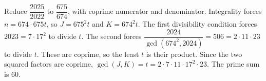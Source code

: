 Reduce $\dfrac{2025}{2022}$ to $\dfrac{675}{674}$, with coprime numerator and denominator. Integrality forces $n=674\cdot675t$, so $J=675^2t$ and $K=674^2t$. The first divisibility condition forces $2023=7\cdot17^2$ to divide $t$. The second forces $\dfrac{2024}{\gcd(674^2,2024)}=506=2\cdot11\cdot23$ to divide $t$. These are coprime, so the least $t$ is their product. Since the two squared factors are coprime, $\gcd(J,K)=t=2\cdot7\cdot11\cdot17^2\cdot23$. The prime sum is $\boxed{60}$.

